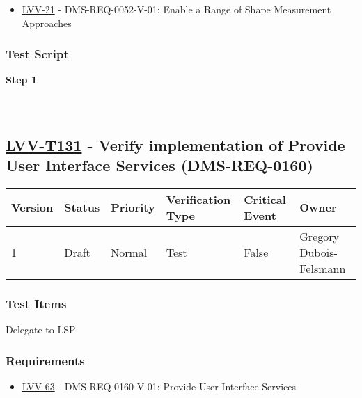 \begin{itemize}
\tightlist
\item
  \href{https://jira.lsstcorp.org/browse/LVV-21}{LVV-21} -
  DMS-REQ-0052-V-01: Enable a Range of Shape Measurement Approaches
\end{itemize}

\hypertarget{test-script-30}{%
\subsubsection{Test Script}\label{test-script-30}}

\textbf{Step 1}\\
~\\
~\\

\hypertarget{lvv-t131---verify-implementation-of-provide-user-interface-services-dms-req-0160}{%
\subsection{\texorpdfstring{\href{https://jira.lsstcorp.org/secure/Tests.jspa\#/testCase/LVV-T131}{LVV-T131}
- Verify implementation of Provide User Interface Services
(DMS-REQ-0160)}{LVV-T131 - Verify implementation of Provide User Interface Services (DMS-REQ-0160)}}\label{lvv-t131---verify-implementation-of-provide-user-interface-services-dms-req-0160}}

\begin{longtable}[]{@{}llllll@{}}
\toprule
Version & Status & Priority & Verification Type & Critical Event &
Owner\tabularnewline
\midrule
\endhead
1 & Draft & Normal & Test & False & Gregory
Dubois-Felsmann\tabularnewline
\bottomrule
\end{longtable}

\hypertarget{test-items-31}{%
\subsubsection{Test Items}\label{test-items-31}}

Delegate to LSP

\hypertarget{requirements-31}{%
\subsubsection{Requirements}\label{requirements-31}}

\begin{itemize}
\tightlist
\item
  \href{https://jira.lsstcorp.org/browse/LVV-63}{LVV-63} -
  DMS-REQ-0160-V-01: Provide User Interface Services
\end{itemize}

